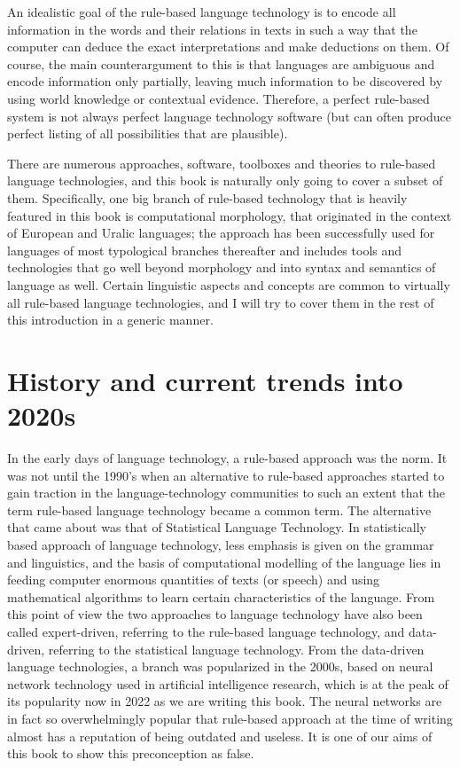\documentclass[free]{flammie}
\begin{document}
An idealistic goal of the rule-based language technology is to encode all
information in the words and their relations in texts in such a way that the
computer can deduce the exact interpretations and make deductions on them. Of
course, the main counterargument to this is that languages are ambiguous and
encode information only partially, leaving much information to be discovered by
using world knowledge or contextual evidence. Therefore, a perfect rule-based
system is not always perfect language technology software (but can often produce
perfect listing of all possibilities that are plausible).

There are numerous approaches, software, toolboxes and theories to rule-based
language technologies, and this book is naturally only going to cover a subset
of them.  Specifically, one big branch of rule-based technology that is heavily
featured in this book is computational morphology, that originated in the
context of European and Uralic languages; the approach has been successfully
used for languages of most typological branches thereafter and includes tools
and technologies that go well beyond morphology and into syntax and semantics of
language as well. Certain linguistic aspects and concepts are common to
virtually all rule-based language technologies, and I will try to cover them in
the rest of this introduction in a generic manner.

\section{History and current trends into 2020s}

In the early days of language technology, a rule-based approach was the norm. It
was not until the 1990’s when an alternative to rule-based approaches started to
gain traction in the language-technology communities to such an extent that the
term rule-based language technology became a common term. The alternative that
came about was that of Statistical Language Technology. In statistically based
approach of language technology, less emphasis is given on the grammar and
linguistics, and the basis of computational modelling of the language lies in
feeding computer enormous quantities of texts (or speech) and using mathematical
algorithms to learn certain characteristics of the language. From this point of
view the two approaches to language technology have also been called
expert-driven, referring to the rule-based language technology, and data-driven,
referring to the statistical language technology. From the data-driven language
technologies, a branch was popularized in the 2000s, based on neural network
technology used in artificial intelligence research, which is at the peak of its
popularity now in 2022 as we are writing this book.  The neural networks are in
fact so overwhelmingly popular that rule-based approach at the time of writing
almost has a reputation of being outdated and useless. It is one of our aims of
this book to show this preconception as false.
\end{document}
